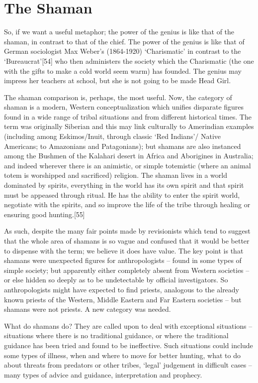 \documentclass[
]{book}
\begin{document}
\hypertarget{the-shaman}{%
\section{The Shaman}\label{the-shaman}}

So, if we want a useful metaphor; the power of the genius is like that of the shaman, in contrast to that of the chief. The power of the genius is like that of German sociologist Max Weber's (1864-1920) `Charismatic' in contrast to the `Bureaucrat'{[}54{]} who then administers the society which the Charismatic (the one with the gifts to make a cold world seem warm) has founded. The genius may impress her teachers at school, but she is not going to be made Head Girl.

The shaman comparison is, perhaps, the most useful. Now, the category of shaman is a modern, Western conceptualization which unifies disparate figures found in a wide range of tribal situations and from different historical times. The term was originally Siberian and this may link culturally to Amerindian examples (including among Eskimos/Inuit, through classic `Red Indians'/ Native Americans; to Amazonians and Patagonians); but shamans are also instanced among the Bushmen of the Kalahari desert in Africa and Aborigines in Australia; and indeed wherever there is an animistic, or simple totemistic (where an animal totem is worshipped and sacrificed) religion. The shaman lives in a world dominated by spirits, everything in the world has its own spirit and that spirit must be appeased through ritual. He has the ability to enter the spirit world, negotiate with the spirits, and so improve the life of the tribe through healing or ensuring good hunting.{[}55{]}

As such, despite the many fair points made by revisionists which tend to suggest that the whole area of shamans is so vague and confused that it would be better to dispense with the term; we believe it does have value. The key point is that shamans were unexpected figures for anthropologists -- found in some types of simple society; but apparently either completely absent from Western societies -- or else hidden so deeply as to be undetectable by official investigators. So anthropologists might have expected to find priests, analogous to the already known priests of the Western, Middle Eastern and Far Eastern societies -- but shamans were not priests. A new category was needed.

What do shamans do? They are called upon to deal with exceptional situations -- situations where there is no traditional guidance, or where the traditional guidance has been tried and found to be ineffective. Such situations could include some types of illness, when and where to move for better hunting, what to do about threats from predators or other tribes, `legal' judgement in difficult cases -- many types of advice and guidance, interpretation and prophecy.
\end{document}
